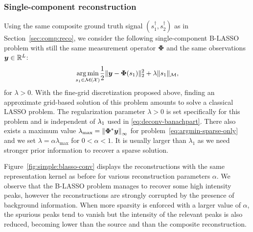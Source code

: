         \subsubsection{Single-component reconstruction}
        Using the same composite ground truth signal $(s_1^\dagger, s_2^\dagger)$ as in Section~\ref{sec:comp:reco}, we consider the following single-component B-LASSO problem with still the same measurement operator $\bm{\Phi}$ and the same observations $\bm{y}\in\mathbb{R}^L$:
        \begin{equation}
            \label{eq:argmin-sparse-only}
            \underset{s_1 \in {\mathcal{M}}({\mathcal{X}})}{\arg\min} \frac{1}{2} \| \bm{y} - \bm{\Phi} (s_1) \|_2^2  + \lambda \| s_1 \|_{\mathcal{M}},
        \end{equation}
        for $\lambda > 0$.
        With the fine-grid discretization proposed above, finding an approximate grid-based solution of this problem amounts to solve a classical LASSO problem. The regularization parameter $\lambda > 0$ is set specifically for this problem and is independent of $\lambda_{1}$ used in \eqref{eq:deconv-banachpart}. There also exists a maximum value $\lambda_\mathrm{max} = \left\lVert\bm{\Phi}^*\bm{y}\right\rVert_\infty$ for problem~\eqref{eq:argmin-sparse-only} and we set $\lambda = \alpha \lambda_\mathrm{max}$ for $0 < \alpha < 1$. It is usually larger than $\lambda_1$ as we need stronger prior information to recover a sparse solution.
        
        Figure~\ref{fig:simple:blasso-conv} displays the reconstructions with the same representation kernel as before for various reconstruction parameters $\alpha$.
        We observe that the B-LASSO problem manages to recover some high intensity peaks, however the reconstructions are strongly corrupted by the presence of background information. When more sparsity is enforced with a larger value of $\alpha$, the spurious peaks tend to vanish but the intensity of the relevant peaks is also reduced, becoming lower than the source and than the composite reconstruction.

